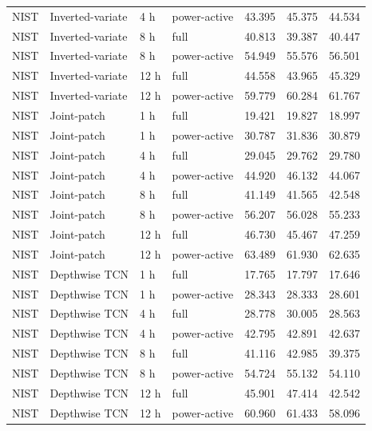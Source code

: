 \begin{longtable}{llllrrr}
NIST & Inverted-variate & 4 h & power-active & 43.395 & 45.375 & 44.534\\
NIST & Inverted-variate & 8 h & full & 40.813 & 39.387 & 40.447\\
NIST & Inverted-variate & 8 h & power-active & 54.949 & 55.576 & 56.501\\
NIST & Inverted-variate & 12 h & full & 44.558 & 43.965 & 45.329\\
NIST & Inverted-variate & 12 h & power-active & 59.779 & 60.284 & 61.767\\
NIST & Joint-patch & 1 h & full & 19.421 & 19.827 & 18.997\\
NIST & Joint-patch & 1 h & power-active & 30.787 & 31.836 & 30.879\\
NIST & Joint-patch & 4 h & full & 29.045 & 29.762 & 29.780\\
NIST & Joint-patch & 4 h & power-active & 44.920 & 46.132 & 44.067\\
NIST & Joint-patch & 8 h & full & 41.149 & 41.565 & 42.548\\
NIST & Joint-patch & 8 h & power-active & 56.207 & 56.028 & 55.233\\
NIST & Joint-patch & 12 h & full & 46.730 & 45.467 & 47.259\\
NIST & Joint-patch & 12 h & power-active & 63.489 & 61.930 & 62.635\\
NIST & Depthwise TCN & 1 h & full & 17.765 & 17.797 & 17.646\\
NIST & Depthwise TCN & 1 h & power-active & 28.343 & 28.333 & 28.601\\
NIST & Depthwise TCN & 4 h & full & 28.778 & 30.005 & 28.563\\
NIST & Depthwise TCN & 4 h & power-active & 42.795 & 42.891 & 42.637\\
NIST & Depthwise TCN & 8 h & full & 41.116 & 42.985 & 39.375\\
NIST & Depthwise TCN & 8 h & power-active & 54.724 & 55.132 & 54.110\\
NIST & Depthwise TCN & 12 h & full & 45.901 & 47.414 & 42.542\\
NIST & Depthwise TCN & 12 h & power-active & 60.960 & 61.433 & 58.096\\
\bottomrule\end{longtable}
